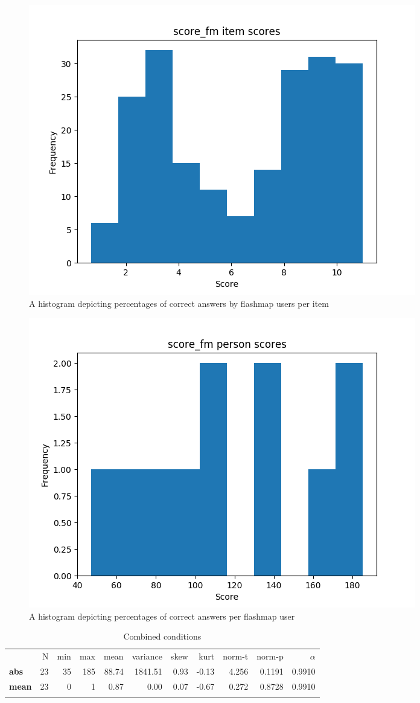 \begin{figure}
    \centering
    \includegraphics[width=.7\textwidth]{img/score_fm_diff.png}
    \caption{A histogram depicting percentages of correct answers by flashmap users per item}
    \label{fig:score_fm_diff}
\end{figure}
\begin{figure}
    \centering
    \includegraphics[width=.7\textwidth]{img/score_fm_abil.png}
    \caption{A histogram depicting percentages of correct answers per flashmap user}
    \label{fig:score_fm_abil}
\end{figure}

\begin{longtable}[c]{@{}lrrrrrrrrrr@{}}
\caption{Combined conditions}
\endfirsthead
\toprule\addlinespace
& N & min & max & mean & variance & skew & kurt & norm-t &
norm-p & $\alpha$
\\\addlinespace
\midrule
\textbf{abs} & 23 & 35 & 185 & 88.74 & 1841.51 & 0.93 & -0.13 & 4.256 & 0.1191 & 0.9910
\\\addlinespace
\textbf{mean} & 23 & 0 & 1 & 0.87 & 0.00 & 0.07 & -0.67 & 0.272 & 0.8728
& 0.9910
\\\addlinespace
\bottomrule
    \label{tab:score_gen}
\end{longtable}

